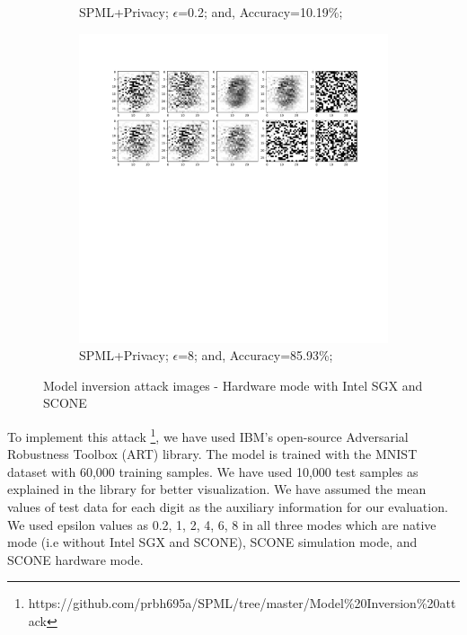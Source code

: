 \begin{figure}
\begin{subfigure}{.325\textwidth}
         \vspace{-8em}
         \caption{SPML+Privacy; $\epsilon$=0.2; and, Accuracy=10.19\%;}
         \label{fig:hwEps.2}
     \end{subfigure}
     \begin{subfigure}{.325\textwidth}
         \includegraphics[width=\textwidth]{images/Hw_attack/Mnistattack8.pdf}
         \vspace{-8em}
         \caption{SPML+Privacy; $\epsilon$=8; and, Accuracy=85.93\%;}
         \label{fig:hwEps8}
     \end{subfigure}
        \caption{Model inversion attack images - Hardware mode with Intel SGX and SCONE}
\end{figure}
To implement this attack \footnote{https://github.com/prbh695a/SPML/tree/master/Model\%20Inversion\%20attack}, we have used IBM's open-source Adversarial Robustness Toolbox (ART) \cite{76} library. The model is trained with the MNIST dataset with 60,000 training samples. We have used 10,000 test samples as explained in the library for better visualization. We have assumed the mean values of test data for each digit as the auxiliary information for our evaluation. We used epsilon values as 0.2, 1, 2, 4, 6, 8 in all three modes which are native mode (i.e without Intel SGX and SCONE), SCONE simulation mode, and SCONE hardware mode.

